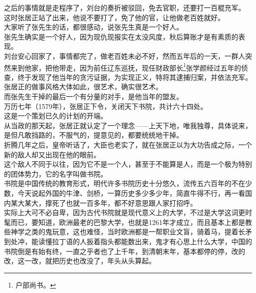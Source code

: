 \begin{multicols}{\theparacolNo}
之后的事情就是走程序了，刘台的奏折被驳回，免去官职，还要打一百棍充军。\\

这时张居正站了出来，他说不要打了，免了他的官，让他做老百姓就好。\\

大家听了张先生的话，都很感动，说张先生真是一个好人。\\

张先生确实是一个好人，因为现仇现报实在太没风度，秋后算账才是有素质的表现。\\

刘台安心回家了，事情都完了，做老百姓未必不好，然而五年后的一天，一群人突然来到他家，把他带走，因为前任辽东巡抚，现任财政部长\footnote{户部尚书。}张学颜经过五年的侦查，终于发现了他当年的贪污证据，为实现正义，特将其逮捕归案，并依法充军。\\

张居正的做事风格大体如此，很艺术，确实很艺术。\\

而张先生干掉的最后一个有分量的对手，是他当年的盟友。\\

万历七年（1579年），张居正下令，关闭天下书院，共计六十四处。\\

这是一个策划已久的计划的开端。\\

从当政的那天起，张居正就认定了一个理念——上天下地，唯我独尊，具体说来，是但凡敢挡路的，不服气的，提意见的，都要统统地干掉。\\

折腾几年之后，皇帝听话了，大臣也老实了，就在张居正以为大功告成之际，一个新的敌人却又出现在他的眼前。\\

这个敌人不同于以往，因为它不是一个人，甚至于不能算是人，而是一个极为特别的团体势力，它的名字叫做书院。\\

书院是中国传统的教育形式，明代许多书院历史十分悠久，流传五六百年的不在少数，今天说起外国的牛津、剑桥，一算历史多少多少年，简直牛得不行，再一看国内某大某大，撑死了也就一百多年，都不好意思跟人家打招呼。\\

实际上大可不必自卑，因为古代书院就是现代意义上的大学，不过是大学这词更时髦而已，要知道，欧洲最老的巴黎大学，也就是1261年才成立，而且基本上都是教些神学之类的鬼玩意，这也难怪，当时欧洲都是一帮职业文盲，骑着马，提着长矛到处冲，能读懂拉丁语的人扳着指头都能数出来，鬼才有心思上什么大学，中国的书院倒是有始有终，一直之乎者也了上千年，到清朝末年，基本都停的停，改的改，这一改，就把历史也改没了，年头从头算起。\\


\end{multicols}
